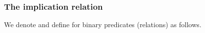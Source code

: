\subsubsection{The implication relation}\label{implication}

We denote and define  for binary predicates (relations) as follows.
\ccpad
\begin{code}%
\>[0]\AgdaSpace{}%
\AgdaSymbol{:}%
\>[100I]\AgdaSymbol{\{}\AgdaSpace{}%
\AgdaSpace{}%
\AgdaSpace{}%
\AgdaSymbol{:}\AgdaSpace{}%
\AgdaSymbol{\}\{}\AgdaSpace{}%
\AgdaSymbol{:}\AgdaSpace{}%
\AgdaSpace{}%
\AgdaSymbol{\}\{}\AgdaSpace{}%
\AgdaSymbol{:}\AgdaSpace{}%
\AgdaSpace{}%
\AgdaSymbol{\}\{}\AgdaSpace{}%
\AgdaSymbol{:}\AgdaSpace{}%
\AgdaSpace{}%
\AgdaSymbol{\}}\<%
\\
\>[0][@{}l@{\AgdaIndent{0}}]%
\>[1]%
\>[.][@{}l@{}]\<[100I]%
\>[7]\AgdaSymbol{(}\AgdaSpace{}%
\AgdaSpace{}%
\AgdaSpace{}%
\AgdaSpace{}%
\AgdaSymbol{)}\AgdaSpace{}%
\AgdaSpace{}%
\AgdaSymbol{(}\AgdaSpace{}%
\AgdaSpace{}%
\AgdaSymbol{)}\AgdaSpace{}%
\AgdaSpace{}%
\AgdaSymbol{(}\AgdaSpace{}%
\AgdaSpace{}%
\AgdaSpace{}%
\AgdaSpace{}%
\AgdaSymbol{)}\<%
\\
%
\\[\AgdaEmptyExtraSkip]%
\>[0]\AgdaSpace{}%
\AgdaSpace{}%
\AgdaSpace{}%
\AgdaSymbol{=}\AgdaSpace{}%
\AgdaSpace{}%
\AgdaSpace{}%
\AgdaSpace{}%
\AgdaSpace{}%
\AgdaSpace{}%
\AgdaSymbol{(}\AgdaSpace{}%
\AgdaSymbol{)}\AgdaSpace{}%
\AgdaSymbol{(}\AgdaSpace{}%
\AgdaSymbol{)}\<%
\\
%
\\[\AgdaEmptyExtraSkip]%
%
\\[\AgdaEmptyExtraSkip]%
\>[0]\AgdaSpace{}%
\AgdaSymbol{:}%
\>[101I]\AgdaSymbol{\{}\AgdaSpace{}%
\AgdaSpace{}%
\AgdaSpace{}%
\AgdaSpace{}%

\end{code}
